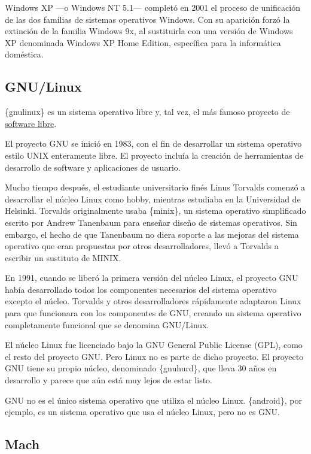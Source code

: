 Windows XP ---o Windows NT 5.1--- completó en 2001 el proceso de
unificación de las dos familias de sistemas operativos Windows. Con su
aparición forzó la extinción de la familia Windows 9x, al sustituirla
con una versión de Windows XP denominada Windows XP Home Edition,
específica para la informática doméstica.

\subsection{GNU/Linux}\label{_gnulinux}

\{gnulinux\} es un sistema operativo libre y, tal vez, el más famoso
proyecto de \href{https://es.wikipedia.org/wiki/Software_libre}{software
libre}.

El proyecto GNU se inició en 1983, con el fin de desarrollar un sistema
operativo estilo UNIX enteramente libre. El proyecto incluía la creación
de herramientas de desarrollo de software y aplicaciones de usuario.

Mucho tiempo después, el estudiante universitario finés Linus Torvalds
comenzó a desarrollar el núcleo Linux como hobby, mientras estudiaba en
la Universidad de Helsinki. Torvalds originalmente usaba \{minix\}, un
sistema operativo simplificado escrito por Andrew Tanenbaum para enseñar
diseño de sistemas operativos. Sin embargo, el hecho de que Tanenbaum no
diera soporte a las mejoras del sistema operativo que eran propuestas
por otros desarrolladores, llevó a Torvalds a escribir un sustituto de
MINIX.

En 1991, cuando se liberó la primera versión del núcleo Linux, el
proyecto GNU había desarrollado todos los componentes necesarios del
sistema operativo excepto el núcleo. Torvalds y otros desarrolladores
rápidamente adaptaron Linux para que funcionara con los componentes de
GNU, creando un sistema operativo completamente funcional que se
denomina GNU/Linux.

El núcleo Linux fue licenciado bajo la GNU General Public License (GPL),
como el resto del proyecto GNU. Pero Linux no es parte de dicho
proyecto. El proyecto GNU tiene su propio núcleo, denominado
\{gnuhurd\}, que lleva 30 años en desarrollo y parece que aún está muy
lejos de estar listo.

GNU no es el único sistema operativo que utiliza el núcleo Linux.
\{android\}, por ejemplo, es un sistema operativo que usa el núcleo
Linux, pero no es GNU.

\subsection{Mach}\label{_mach}


